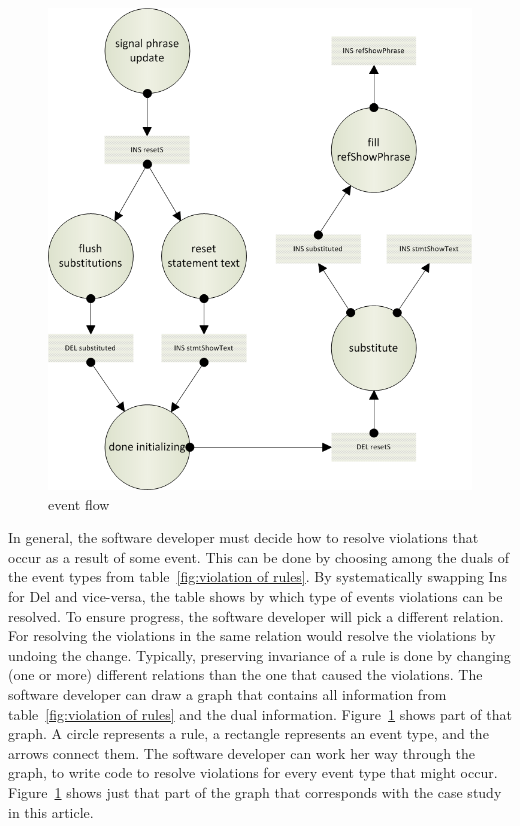 \documentclass{elsarticle}
\begin{document}
\begin{figure}[bht]
\begin{center}
  \includegraphics[scale=.55]{eventFlow.png}
\end{center}
\caption{event flow}
\label{fig:event flow}
\end{figure}
	In general, the software developer must decide how to resolve violations that occur as a result of some event.
	This can be done by choosing among the duals of the event types from table~\ref{fig:violation of rules}.
	By systematically swapping Ins for Del and vice-versa,
	the table shows by which type of events violations can be resolved.
	To ensure progress, the software developer will pick a different relation.
	For resolving the violations in the same relation would resolve the violations by undoing the change.
        Typically, preserving invariance of a rule is done by changing (one or more) different relations than the one that caused the violations.
	The software developer can draw a graph that contains all information from table~\ref{fig:violation of rules}
	and the dual information.
	Figure~\ref{fig:event flow} shows part of that graph.
	A circle represents a rule, a rectangle represents an event type, and the arrows connect them.
	The software developer can work her way through the graph, to write code to resolve violations for every event type that might occur.
	Figure~\ref{fig:event flow} shows just that part of the graph that corresponds with the case study in this article.
\end{document}
